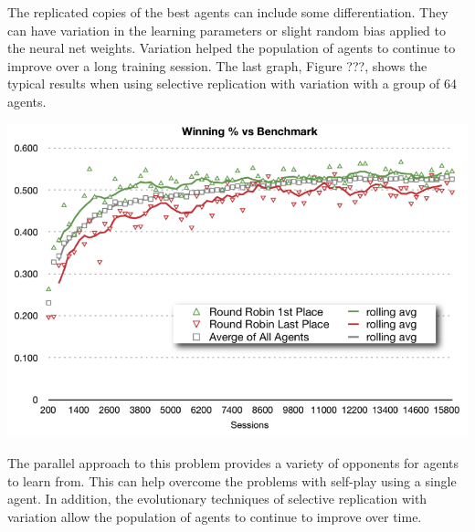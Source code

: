 \begin{flushleft}

The replicated copies of the best agents can include some differentiation.  They can have variation in the learning parameters or slight random bias applied to the neural net weights.  Variation helped the population of agents to continue to improve over a long training session.  The last graph, Figure ???, shows the typical results when using selective replication with variation with a group of 64 agents.  

\end{flushleft}
\center
\includegraphics[scale=0.8]{fig20}
\begin{flushleft}


The parallel approach to this problem provides a variety of opponents for agents to learn from.  This can help overcome the problems with self-play using a single agent.  In addition, the evolutionary techniques of selective replication with variation allow the population of agents to continue to improve over time.

%


\end{flushleft}

